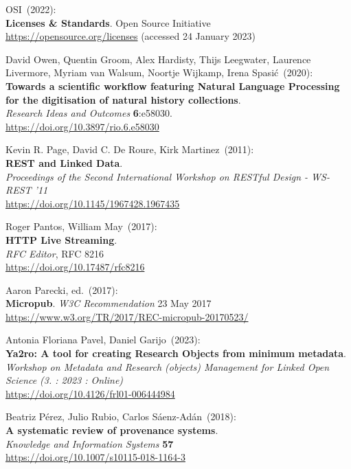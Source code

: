 \begin{thebibliography}{9}
OSI~(2022): \\
\textbf{Licenses \& {Standards}}.
Open Source Initiative\\
\url{https://opensource.org/licenses} (accessed 24 January 2023)

David Owen, Quentin Groom, Alex Hardisty, Thijs Leegwater, Laurence Livermore, Myriam van Walsum, Noortje Wijkamp, Irena Spasić~(2020): \\
\textbf{Towards a scientific workflow featuring Natural
Language Processing for the digitisation of natural history collections}.\\
\emph{Research Ideas and Outcomes} \textbf{6}:e58030.\\
\url{https://doi.org/10.3897/rio.6.e58030}

Kevin R. Page, David C. De Roure, Kirk Martinez~(2011): \\
\textbf{{REST} and {Linked Data}}. \\
\emph{Proceedings of the {Second International Workshop} on {RESTful Design} - {WS-REST} '11} \\
\url{https://doi.org/10.1145/1967428.1967435}

Roger Pantos, William May~(2017): \\
\textbf{HTTP Live Streaming}. \\
\emph{RFC Editor}, RFC 8216\\
\url{https://doi.org/10.17487/rfc8216}

Aaron Parecki, ed.~(2017): \\
\textbf{Micropub}. 
\emph{W3C Recommendation} 23 May 2017\\
\url{https://www.w3.org/TR/2017/REC-micropub-20170523/}

Antonia Floriana Pavel, Daniel Garijo~(2023): \\
\textbf{Ya2ro: A tool for creating Research Objects from minimum metadata}.\\
\emph{Workshop on Metadata and Research (objects) Management for Linked Open Science (3. : 2023 : Online)}\\
\url{https://doi.org/10.4126/frl01-006444984}

Beatriz Pérez, Julio Rubio, Carlos Sáenz-Adán~(2018): \\
\textbf{A systematic review of provenance systems}.\\
\emph{Knowledge and Information Systems} \textbf{57}\\
\url{https://doi.org/10.1007/s10115-018-1164-3} 


\end{thebibliography}
